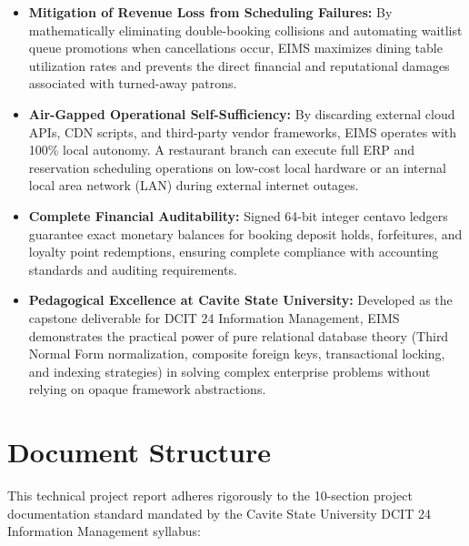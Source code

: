 \begin{itemize}
    \item \textbf{Mitigation of Revenue Loss from Scheduling Failures:} By mathematically eliminating double-booking collisions and automating waitlist queue promotions when cancellations occur, EIMS maximizes dining table utilization rates and prevents the direct financial and reputational damages associated with turned-away patrons.
    \item \textbf{Air-Gapped Operational Self-Sufficiency:} By discarding external cloud APIs, CDN scripts, and third-party vendor frameworks, EIMS operates with 100\% local autonomy. A restaurant branch can execute full ERP and reservation scheduling operations on low-cost local hardware or an internal local area network (LAN) during external internet outages.
    \item \textbf{Complete Financial Auditability:} Signed 64-bit integer centavo ledgers guarantee exact monetary balances for booking deposit holds, forfeitures, and loyalty point redemptions, ensuring complete compliance with accounting standards and auditing requirements.
    \item \textbf{Pedagogical Excellence at Cavite State University:} Developed as the capstone deliverable for DCIT 24 Information Management, EIMS demonstrates the practical power of pure relational database theory (Third Normal Form normalization, composite foreign keys, transactional locking, and indexing strategies) in solving complex enterprise problems without relying on opaque framework abstractions.
\end{itemize}

\section{Document Structure}
\label{sec:intro_structure}
This technical project report adheres rigorously to the 10-section project documentation standard mandated by the Cavite State University DCIT 24 Information Management syllabus:

